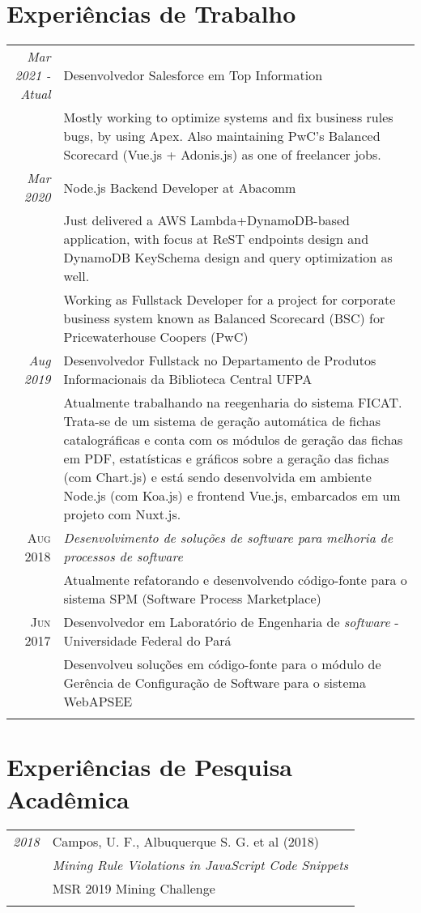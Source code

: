 \documentclass[a4paper,10pt]{article}
\begin{document}
\section{Experiências de Trabalho}
\begin{tabular}{r|p{11cm}}
\emph{Mar 2021 - Atual} & Desenvolvedor Salesforce em Top Information
 \\ & \footnotesize{Mostly working to optimize systems and fix business rules bugs, by using Apex. Also maintaining PwC's Balanced Scorecard (Vue.js + Adonis.js) as one of freelancer jobs.}\\
 \emph{Mar 2020} & Node.js Backend Developer at Abacomm
 \\ & \footnotesize{Just delivered a AWS Lambda+DynamoDB-based application, with focus at ReST endpoints design and DynamoDB KeySchema design and query optimization as well.} \\
 & \footnotesize{Working as Fullstack Developer for a project for corporate business system known as Balanced Scorecard (BSC) for Pricewaterhouse Coopers (PwC)} \\
 \emph{Aug 2019} & Desenvolvedor Fullstack no Departamento de Produtos Informacionais da Biblioteca Central UFPA\\ & \footnotesize{Atualmente trabalhando na reegenharia do sistema FICAT. Trata-se de um sistema de geração automática de fichas catalográficas e conta com os módulos de geração das fichas em PDF, estatísticas e gráficos sobre a geração das fichas (com Chart.js) e está sendo desenvolvida em ambiente Node.js (com Koa.js) e frontend Vue.js, embarcados em um projeto com Nuxt.js.} \\
 \textsc{Aug 2018} & \emph{Desenvolvimento de soluções de \textit{software} para melhoria de processos de \textit{software}}\\& \footnotesize{Atualmente refatorando e desenvolvendo código-fonte para o sistema SPM (Software Process Marketplace)}\\
 \textsc{Jun 2017} & Desenvolvedor em Laboratório de Engenharia de \textit{software} - Universidade Federal do Pará \\ & \footnotesize{Desenvolveu soluções em código-fonte para o módulo de Gerência de Configuração de Software para o sistema WebAPSEE}\\\multicolumn{2}{c}{} \\
\end{tabular}

\section{Experiências de Pesquisa Acadêmica}
\begin{tabular}{r|p{11cm}}
 \emph{2018} & Campos, U. F., Albuquerque S. G. et al (2018)\\
 & \textit{Mining Rule Violations in JavaScript Code Snippets}\\
 & MSR 2019 Mining Challenge\\\multicolumn{2}{c}{} \\
\end{tabular}
\end{document}
